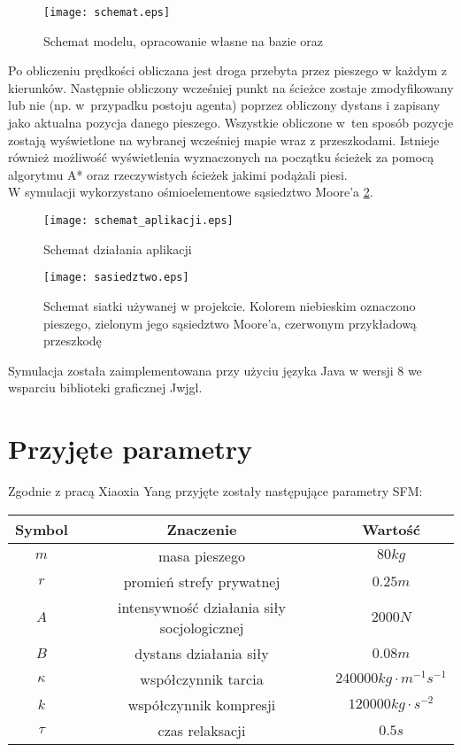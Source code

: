 \begin{figure}
\centering
\texttt{[image: schemat.eps]}
\caption{Schemat modelu, opracowanie własne na bazie \cite{6} oraz \cite{SocialForceSuwala}}
\label{siatka}
\end{figure}

Po obliczeniu prędkości obliczana jest droga przebyta przez pieszego w każdym z kierunków. Następnie obliczony wcześniej punkt na ścieżce zostaje zmodyfikowany lub nie (np. w~przypadku postoju agenta) poprzez obliczony dystans i zapisany jako aktualna pozycja danego pieszego. Wszystkie obliczone w~ten sposób pozycje zostają wyświetlone na wybranej wcześniej mapie wraz z przeszkodami. Istnieje również możliwość wyświetlenia wyznaczonych na początku ścieżek za pomocą algorytmu A* oraz rzeczywistych ścieżek jakimi podążali piesi.\\

W symulacji wykorzystano ośmioelementowe sąsiedztwo Moore'a \ref{figure:siatka}. 

\begin{figure}
\centering
\texttt{[image: schemat\_aplikacji.eps]}
\caption{Schemat działania aplikacji}
\label{figure:siatka}
\end{figure}

\begin{figure}
\centering
\texttt{[image: sasiedztwo.eps]}
\caption{Schemat siatki używanej w projekcie. Kolorem niebieskim oznaczono pieszego, zielonym jego sąsiedztwo Moore'a, czerwonym przykładową przeszkodę}
\label{figure:sasiedztwo}
\end{figure}

Symulacja została zaimplementowana przy użyciu języka Java w wersji 8 we wsparciu biblioteki graficznej Jwjgl.

\newpage

\section{Przyjęte parametry}

Zgodnie z pracą Xiaoxia Yang \cite{GuideCrowdDynViaModifiedSocialForceModel} przyjęte zostały następujące parametry SFM:\\

\begin{center}
\begin{tabular}{c||c|c}
Symbol & Znaczenie & Wartość\\
\hline
$m$ & masa pieszego & $80kg$ \\ 
$r$ & promień strefy prywatnej & $0.25m$ \\
$A$ & intensywność działania siły socjologicznej & $2000 N$ \\
$B$ & dystans działania siły & $0.08 m$ \\
$\kappa$ & współczynnik tarcia & $240000 kg \cdot m^{-1}s^{-1}$ \\
$k$ & współczynnik kompresji & $120000 kg \cdot s^{-2}$ \\
$\tau$ & czas relaksacji & $0.5 s$ \\
\end{tabular} 
\end{center}
